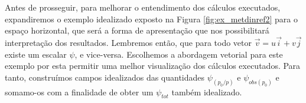 % 
% 

Antes de prosseguir, para melhorar o entendimento dos cálculos executados, expandiremos o exemplo idealizado exposto
na Figura \ref{fig:ex_metdinref2} para o espaço horizontal, que
será a forma de apresentação que nos possibilitará interpretação dos resultados.
Lembremos então, que para todo vetor $\vec{v} = u\vec{i} + v\vec{j}$ existe 
um escalar $\psi$, e vice-versa. Escolhemos a abordagem vetorial para este exemplo por esta permitir uma melhor visualização
dos cálculos executados. Para tanto, construímos campos idealizados das quantidades
$\psi_{(p_0/p)}$ e $\psi_{obs(p_0)}$ e somamo-os com a finalidade de obter um $\psi_{tot}$ também idealizado. 

